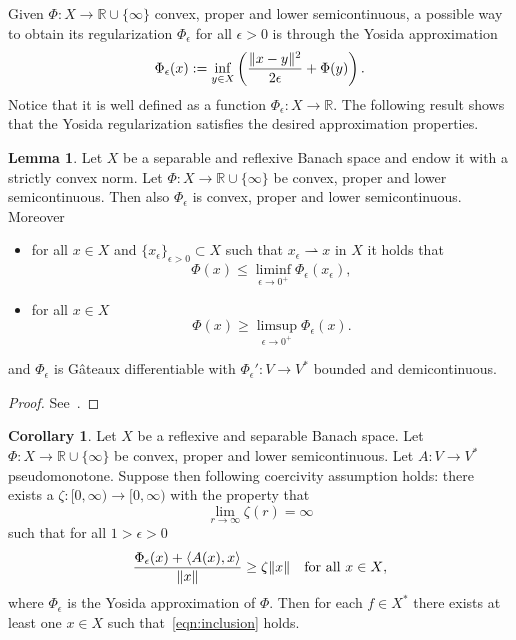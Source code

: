 \documentclass[a4paper,10pt,twoside]{amsbook}
\numberwithin{section}{chapter}
\numberwithin{equation}{chapter}
\theoremstyle{definition}
\newtheorem{cor}[prop]{Corollary}
\newtheorem{lemma}[prop]{Lemma}
\newtheorem{rmk}[prop]{Remark}
\DeclarePairedDelimiter{\norm}{\lVert}{\rVert}
\DeclarePairedDelimiter{\dual}{\langle}{\rangle}
\begin{document}
Given $\Phi\colon X\to\mathbb{R}\cup\{\infty\}$ convex, proper and lower semicontinuous, a possible way to obtain its regularization $\Phi_\epsilon$ for all $\epsilon>0$ is through the Yosida approximation
\[
\Phi_\epsilon(x):=\inf_{y\in X}\left(\frac{\norm{x-y}^2}{2\epsilon}+\Phi(y)\right).
\]
Notice that it is well defined as a function $\Phi_\epsilon\colon X\to\mathbb{R}$. The following result shows that the Yosida regularization satisfies the desired approximation properties.
\begin{lemma}
\label{lemma:yosida}
Let $X$ be a separable and reflexive Banach space and endow it with a strictly convex norm. Let $\Phi\colon X\to\mathbb{R}\cup\{\infty\}$ be convex, proper and lower semicontinuous. Then also $\Phi_\epsilon$ is convex, proper and lower semicontinuous. Moreover
\begin{itemize}
\item[(i)] for all $x\in X$ and $\{x_\epsilon\}_{\epsilon>0}\subset X$ such that $x_\epsilon\rightharpoonup x$ in $X$ it holds that
\[
\Phi(x)\le\liminf_{\epsilon\to0^+}\Phi_\epsilon(x_\epsilon),
\]
\item[(ii)] for all $x\in X$
\[
\Phi(x)\ge\limsup_{\epsilon\to 0^+}\Phi_\epsilon(x).
\]
\end{itemize}
and $\Phi_\epsilon$ is G\^ateaux differentiable with $\Phi_\epsilon'\colon V\to V^*$ bounded and demicontinuous.
\end{lemma}
\begin{proof}
See~\cite[Lemma 5.17]{roubicek-pde}.
\end{proof}
\begin{cor}
\label{cor:corollary-5-19}
Let $X$ be a reflexive and separable Banach space. Let $\Phi\colon X\to\mathbb{R}\cup\{\infty\}$ be convex, proper and lower semicontinuous. Let $A\colon V\to V^*$ pseudomonotone. Suppose then following coercivity assumption holds: there exists a $\zeta\colon[0,\infty)\to[0,\infty)$ with the property that
\[
\lim_{r\to\infty}\zeta(r)=\infty
\]
such that for all $1>\epsilon>0$
\[
\frac{\Phi_\epsilon(x)+\dual{A(x),x}}{\norm{x}}\ge\zeta{\norm{x}}\quad\text{for all $x\in X$},
\]
where $\Phi_\epsilon$ is the Yosida approximation of $\Phi$. Then for each $f\in X^*$ there exists at least one $x\in X$ such that~\eqref{eqn:inclusion} holds.
\end{cor}
\end{document}
